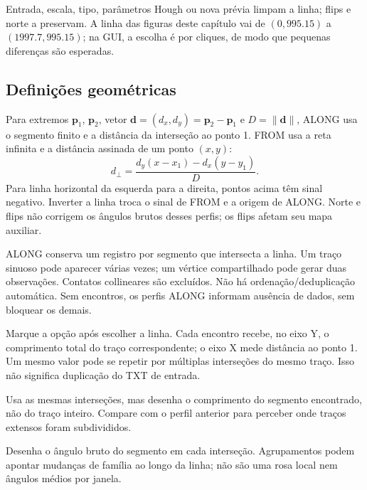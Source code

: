 Entrada, escala, tipo, parâmetros Hough ou nova prévia limpam a linha; flips e norte a preservam. A linha das figuras deste capítulo vai de \((0,995.15)\) a \((1997.7,995.15)\); na GUI, a escolha é por cliques, de modo que pequenas diferenças são esperadas.

\subsection{Definições geométricas}
Para extremos \(\mathbf p_1\), \(\mathbf p_2\), vetor \(\mathbf d=(d_x,d_y)=\mathbf p_2-\mathbf p_1\) e \(D=\|\mathbf d\|\), ALONG usa o segmento finito e a distância da interseção ao ponto 1. FROM usa a reta infinita e a distância assinada de um ponto \((x,y)\):
\begin{equation}
d_\perp=\frac{d_y(x-x_1)-d_x(y-y_1)}{D}.
\end{equation}
Para linha horizontal da esquerda para a direita, pontos acima têm sinal negativo. Inverter a linha troca o sinal de FROM e a origem de ALONG. Norte e flips não corrigem os ângulos brutos desses perfis; os flips afetam seu mapa auxiliar.

ALONG conserva um registro por segmento que intersecta a linha. Um traço sinuoso pode aparecer várias vezes; um vértice compartilhado pode gerar duas observações. Contatos collineares são excluídos. Não há ordenação/deduplicação automática. Sem encontros, os perfis ALONG informam ausência de dados, sem bloquear os demais.

Marque a opção após escolher a linha. Cada encontro recebe, no eixo Y, o comprimento total do traço correspondente; o eixo X mede distância ao ponto 1. Um mesmo valor pode se repetir por múltiplas interseções do mesmo traço. Isso não significa duplicação do TXT de entrada.

Usa as mesmas interseções, mas desenha o comprimento do segmento encontrado, não do traço inteiro. Compare com o perfil anterior para perceber onde traços extensos foram subdivididos.

Desenha o ângulo bruto do segmento em cada interseção. Agrupamentos podem apontar mudanças de família ao longo da linha; não são uma rosa local nem ângulos médios por janela.

